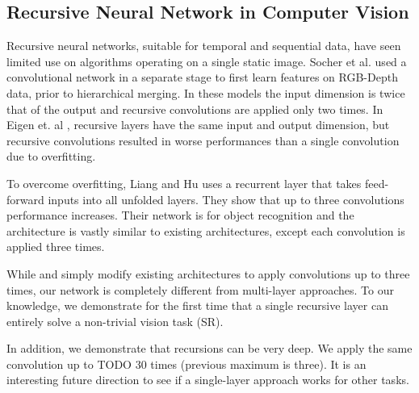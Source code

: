 \documentclass[10pt,twocolumn,letterpaper]{article}
\begin{document}
\subsection{Recursive Neural Network in Computer Vision}

%

Recursive neural networks, suitable for temporal and sequential data, have seen limited use on algorithms operating on a single static image.   Socher et al.  \cite{socher2012convolutional} used a convolutional network in a separate stage to first learn features on RGB-Depth data, prior to hierarchical merging. In these models the input dimension is twice that of the output and recursive convolutions are applied only two times. In Eigen et. al \cite{Eigen2014}, recursive layers have the same input and output dimension, but recursive convolutions resulted in worse performances than a single convolution due to overfitting. 

To overcome overfitting, Liang and Hu \cite{Liang_2015_CVPR} uses a recurrent layer that takes feed-forward inputs into all unfolded layers. They show that up to three convolutions performance increases. Their network is for object recognition and the architecture is vastly similar to existing architectures, except each convolution is applied three times. 

While \cite{Eigen2014} and \cite{Liang_2015_CVPR} simply modify existing architectures to apply convolutions up to three times, our network is completely different from multi-layer approaches. To our knowledge, we demonstrate for the first time that a single recursive layer can entirely solve a non-trivial vision task (SR). 

In addition, we demonstrate that recursions can be very deep. We apply the same convolution up to TODO 30 times (previous maximum is three). It is an interesting future direction to see if a single-layer approach works for other tasks.  
\end{document}
